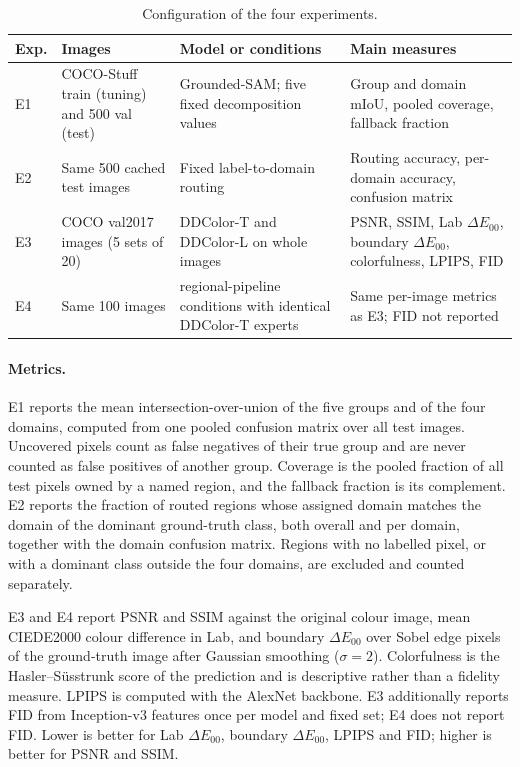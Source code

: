 \documentclass{FastFyp}
\begin{document}
\begin{table}[htbp]
\centering
\caption{Configuration of the four experiments.}
\label{tab:experiment-setup}
\small
\begin{tabular}{>{\raggedright\arraybackslash}p{0.8cm}>{\raggedright\arraybackslash}p{3.4cm}>{\raggedright\arraybackslash}p{4.0cm}>{\raggedright\arraybackslash}p{5.6cm}}
\hline
Exp. & Images & Model or conditions & Main measures \\
\hline
E1 & 200 COCO-Stuff train (tuning) and 500 val (test) & Grounded-SAM; five fixed decomposition values & Group and domain mIoU, pooled coverage, fallback fraction \\
E2 & Same 500 cached test images & Fixed label-to-domain routing & Routing accuracy, per-domain accuracy, confusion matrix \\
E3 & 100 COCO val2017 images (5 sets of 20) & DDColor-T and DDColor-L on whole images & PSNR, SSIM, Lab $\Delta E_{00}$, boundary $\Delta E_{00}$, colorfulness, LPIPS, FID \\
E4 & Same 100 images & 13 regional-pipeline conditions with identical DDColor-T experts & Same per-image metrics as E3; FID not reported \\
\hline
\end{tabular}
\end{table}

\paragraph{Metrics.}
E1 reports the mean intersection-over-union of the five groups and of the four
domains, computed from one pooled confusion matrix over all test images.
Uncovered pixels count as false negatives of their true group and are never
counted as false positives of another group. Coverage is the pooled fraction of
all test pixels owned by a named region, and the fallback fraction is its
complement. E2 reports the fraction of routed regions whose assigned domain
matches the domain of the dominant ground-truth class, both overall and per
domain, together with the domain confusion matrix. Regions with no labelled
pixel, or with a dominant class outside the four domains, are excluded and
counted separately.

E3 and E4 report PSNR and SSIM against the original colour image, mean
CIEDE2000 colour difference in Lab, and boundary $\Delta E_{00}$ over Sobel
edge pixels of the ground-truth image after Gaussian smoothing
($\sigma=2$). Colorfulness is the Hasler--S\"usstrunk score of the prediction
and is descriptive rather than a fidelity measure. LPIPS is computed with the
AlexNet backbone. E3 additionally reports FID from Inception-v3 features once per model and fixed set; E4 does not report FID. Lower is better for Lab $\Delta E_{00}$, boundary
$\Delta E_{00}$, LPIPS and FID; higher is better for PSNR and SSIM.
\end{document}
